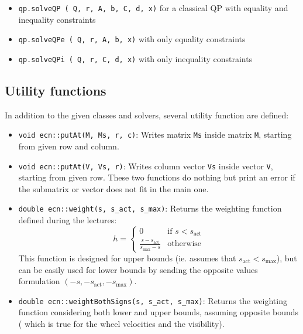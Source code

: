 \documentclass{ecnreport}
\begin{document}
\begin{itemize}
 \item \texttt{qp.solveQP ( Q, r, A, b, C, d, x)} for a classical QP with equality and inequality constraints
 \item  \texttt{qp.solveQPe ( Q, r, A, b, x)} with only equality constraints
 \item  \texttt{qp.solveQPi ( Q, r, C, d, x)} with only inequality constraints
\end{itemize}


\subsection{Utility functions}

In addition to the given classes and solvers, several utility function are defined:
\begin{itemize}
 \item \texttt{void ecn::putAt(M, Ms, r, c)}: Writes matrix \texttt{Ms} inside matrix \texttt{M}, starting from given row and column.
 \item \texttt{void ecn::putAt(V, Vs, r)}: Writes column vector \texttt{Vs} inside vector \texttt{V}, starting from given row. These two functions do nothing but print an error
 if the submatrix or vector does not fit in the main one.
 \item \texttt{double ecn::weight(s, s\_act, s\_max)}: Returns the weighting function defined during the lectures:
 \begin{equation*}
  h = \left\{\begin{array}{cl}
              0 & \text{if } s < s_{\text{act}} \\
              \displaystyle \frac{s-s_{\text{act}}}{s_{\max}-s} & \text{otherwise}
             \end{array}\right.
 \end{equation*}This function is designed for upper bounds (ie. assumes that $s_{\text{act}} < s_{\text{max}}$), but can be easily used for lower bounds by sending the opposite values formulation
 $(-s,-s_{\text{act}}, -s_{\max})$.
\item \texttt{double ecn::weightBothSigns(s, s\_act, s\_max)}: Returns the weighting function considering both lower and upper bounds, assuming opposite bounds (
which is true for the wheel velocities and the visibility).
\end{itemize}
\end{document}

